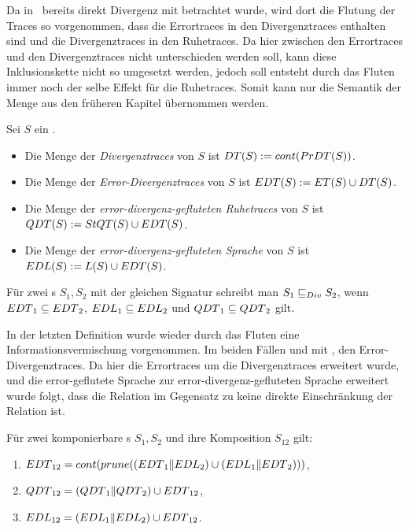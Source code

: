 Da in~\cite{Chilton2013} bereits direkt Divergenz mit betrachtet wurde, wird
dort die Flutung der Traces so vorgenommen, dass die Errortraces in den
Divergenztraces enthalten sind und die Divergenztraces in den Ruhetraces. Da
hier zwischen den Errortraces und den Divergenztraces nicht unterschieden
werden soll, kann diese Inklusionskette nicht so umgesetzt werden, jedoch soll
entsteht durch das Fluten immer noch der selbe Effekt für die Ruhetraces. Somit
kann nur die Semantik der Menge \ET{} aus den früheren Kapitel übernommen
werden.

\begin{Def}
\label{DefRuheDivSemantik}
  Sei $S$ ein \EIO{}.
  \begin{itemize}
    \item Die Menge der \emph{Divergenztraces} von $S$ ist $DT{}(S) :=
      cont{}(PrDT{}(S))$.
    \item Die Menge der \emph{Error-Divergenztraces} von $S$ ist $EDT{}(S) :=
      ET{}(S)\cup DT{}(S)$.
    \item Die Menge der \emph{error-divergenz-gefluteten Ruhetraces} von $S$
      ist $QDT{}(S) := StQT{}(S)\cup EDT{}(S)$.
    \item Die Menge der \emph{error-divergenz-gefluteten Sprache} von $S$ ist
      $EDL{}(S) := L(S) \cup EDT{}(S)$.
  \end{itemize}
  Für zwei \EIO{}s $S_1, S_2$ mit der gleichen Signatur schreibt man $S_1\sqsubseteq _{Div}
  S_2$, wenn $EDT{}_1\subseteq EDT{}_2$, $EDL{}_1\subseteq EDL{}_2$ und
  $QDT{}_1\subseteq QDT{}_2$ gilt.
\end{Def}

In der letzten Definition wurde wieder durch das Fluten eine
Informationsvermischung vorgenommen. Im beiden Fällen \QDT{} und \EDL{} mit
\EDT{}, den Error-Divergenztraces. Da hier die Errortraces um die
Divergenztraces erweitert wurde, und die error-geflutete Sprache zur
error-divergenz-gefluteten Sprache erweitert wurde folgt, dass die Relation
\DRel{} im Gegensatz zu \QRel{} keine direkte Einschränkung der Relation
\ERel{} ist.

\begin{satz}
\label{satzDivSemantik}
  Für zwei komponierbare \EIO{}s $S_1, S_2$ und ihre Komposition
  $S_{12}$ gilt:
  \begin{enumerate}
    \item $EDT{}_{12}=cont (prune ((EDT{}_1\|EDL{}_2)\cup
      (EDL{}_1\|EDT{}_2)))$,
    \item $QDT{}_{12}=(QDT{}_1\|QDT{}_2)\cup EDT{}_{12}$,
    \item $EDL{}_{12}=(EDL{}_1\|EDL{}_2)\cup EDT{}_{12}$.
  \end{enumerate}
\end{satz}

